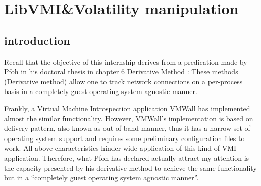 
\chapter{LibVMI\&Volatility manipulation} %

\label{Chapter7} %



\section{introduction}
Recall that the objective of this internship derives from a predication made by Pfoh in his doctoral thesis in chapter 6 Derivative Method \cite{Reference7}: 
These methods (Derivative method) allow one to track network connections on a per-process basis in a completely guest operating system agnostic manner.

Frankly, a Virtual Machine Introspection application VMWall \cite{Reference2} has implemented almost the similar functionality. 
However, VMWall’s implementation is based on delivery pattern, also known as out-of-band manner, 
thus it has a narrow set of operating system support and requires some preliminary configuration files to work. 
All above characteristics hinder wide application of this kind of VMI application. Therefore, what Pfoh has declared actually 
attract my attention is the capacity presented by his derivative method to achieve the same functionality but in a 
“completely guest operating system agnostic manner”.

